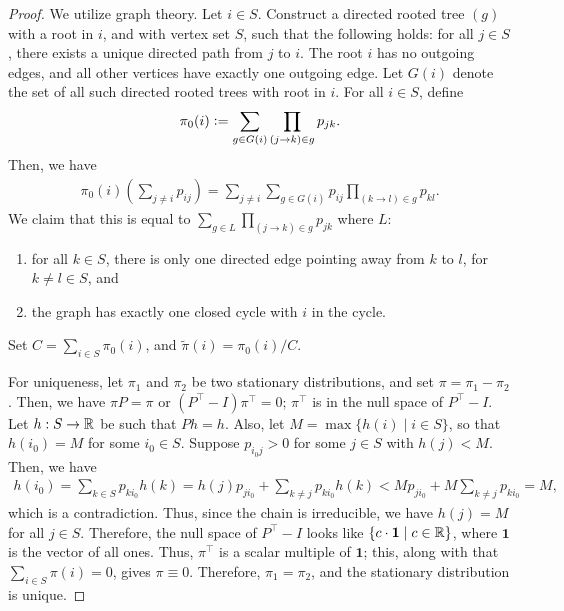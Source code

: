 \begin{proof}
    We utilize graph theory. Let $i \in S$. Construct a directed rooted tree $(g)$ with a root in $i$, and with vertex set $S$, such that the following holds: for all $j \in S$, there exists a unique directed path from $j$ to $i$. The root $i$ has no outgoing edges, and all other vertices have exactly one outgoing edge. Let $G(i)$ denote the set of all such directed rooted trees with root in $i$. For all $i \in S$, define
    \begin{align}
        \pi_{0}(i) \vcentcolon= \sum_{g \in G(i)} \prod_{(j \rightarrow k) \in g} p_{jk}.
    \end{align}
    Then, we have
    \begin{align}
        \pi_{0}(i) \left(\sum_{j \neq i} p_{ij} \right) = \sum_{j \neq i} \sum_{g \in G(i)} p_{ij} \prod_{(k \rightarrow l) \in g} p_{kl}.
    \end{align}
    We claim that this is equal to $\sum_{g \in L} \prod_{(j \rightarrow k) \in g} p_{jk}$ where $L$:
    \begin{enumerate}
        \item for all $k \in S$, there is only one directed edge pointing away from $k$ to $l$, for $k \neq l \in S$, and
        \item the graph has exactly one closed cycle with $i$ in the cycle.
    \end{enumerate}
    Set $C = \sum_{i \in S} \pi_{0}(i)$, and $\tilde{\pi}(i) = \pi_{0}(i)/C$.

    For uniqueness, let $\pi_{1}$ and $\pi_{2}$ be two stationary distributions, and set $\pi = \pi_{1} - \pi_{2}$. Then, we have $\pi P = \pi$ or $(P^{\top}-I)\pi^{\top} = 0$; $\pi^{\top}$ is in the null space of $P^{\top}-I$. Let $h:S \to \mathbb{R}$ be such that $Ph = h$. Also, let $M = \max\{h(i) \mid i \in S\}$, so that $h(i_{0}) = M$ for some $i_{0} \in S$. Suppose $p_{i_{0}j} > 0$ for some $j \in S$ with $h(j) < M$. Then, we have
    \begin{align}
        h(i_{0}) = \sum_{k \in S} p_{ki_{0}} h(k) = h(j) p_{ji_{0}} + \sum_{k \neq j} p_{ki_{0}} h(k) < M p_{ji_{0}} + M \sum_{k \neq j} p_{ki_{0}} = M,
    \end{align}
    which is a contradiction. Thus, since the chain is irreducible, we have $h(j) = M$ for all $j \in S$. Therefore, the null space of $P^{\top}-I$ looks like $\{c \cdot \mathbf{1} \mid c \in \mathbb{R}\}$, where $\mathbf{1}$ is the vector of all ones. Thus, $\pi^{\top}$ is a scalar multiple of $\mathbf{1}$; this, along with that $\sum_{i \in S} \pi(i) = 0$, gives $\pi \equiv 0$. Therefore, $\pi_{1} = \pi_{2}$, and the stationary distribution is unique.
\end{proof}

